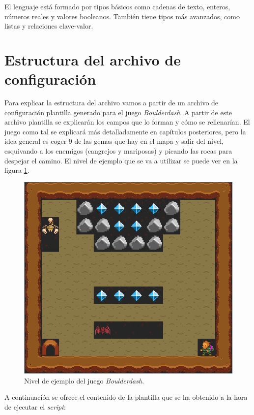 El lenguaje está formado por tipos básicos como cadenas de texto, enteros, números reales y valores
booleanos. También tiene tipos más avanzados, como listas y relaciones clave-valor.

\section{Estructura del archivo de configuración}

Para explicar la estructura del archivo vamos a partir de un archivo de configuración plantilla
generado para el juego \textit{Boulderdash}. A partir de este archivo plantilla se explicarán los campos
que lo forman y cómo se rellenarían. El juego como tal se explicará más detalladamente en capítulos
posteriores, pero la idea general es coger 9 de las gemas que hay en el mapa y salir del
nivel, esquivando a los enemigos (cangrejos y mariposas) y picando las rocas para despejar el camino.
El nivel de ejemplo que se va a utilizar se puede ver en la figura \ref{fig:boulderdash-example}.

\begin{figure}[H]
    \centering
    \includegraphics[scale=0.38]{img/CH06/boulderdash.png}
    \caption{Nivel de ejemplo del juego \textit{Boulderdash}.}
    \label{fig:boulderdash-example}
\end{figure}

A continuación se ofrece el contenido de la plantilla que se ha obtenido a la hora de ejecutar
el \textit{script}:

